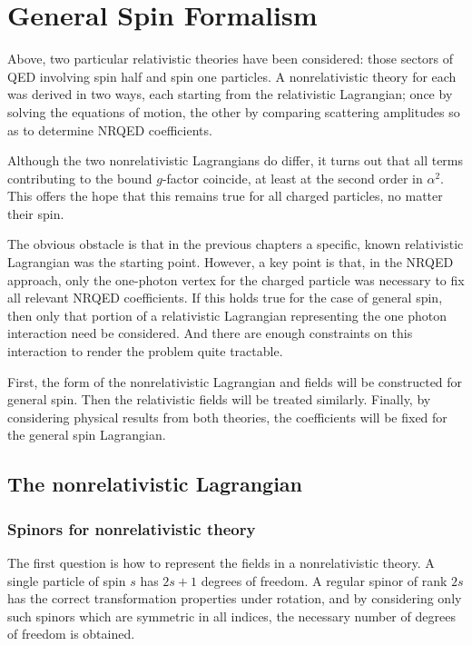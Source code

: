 
\chapter{General Spin Formalism}

Above, two particular relativistic theories have been considered: those sectors of QED involving spin half and spin one particles.  A nonrelativistic theory for each was derived in two ways, each starting from the relativistic Lagrangian; once by solving the equations of motion, the other by comparing scattering amplitudes so as to determine NRQED coefficients.

Although the two nonrelativistic Lagrangians do differ, it turns out that all terms contributing to the bound $g$-factor coincide, at least at the second order in $\alpha^2$.  This offers the hope that this remains true for all charged particles, no matter their spin.

The obvious obstacle is that in the previous chapters a specific, known relativistic Lagrangian was the starting point.  However, a key point is that, in the NRQED approach, only the one-photon vertex for the charged particle was necessary to fix all relevant NRQED coefficients.  If this holds true for the case of general spin, then only that portion of a relativistic Lagrangian representing the one photon interaction need be considered.  And there are enough constraints on this interaction to render the problem quite tractable.

First, the form of the nonrelativistic Lagrangian and fields will be constructed for general spin.  Then the relativistic fields will be treated similarly.  Finally, by considering physical results from both theories, the coefficients will be fixed for the general spin Lagrangian.



\section{The nonrelativistic Lagrangian}
\subsection{Spinors for nonrelativistic theory}
The first question is how to represent the fields in a nonrelativistic theory.  A single particle of spin $s$ has $2s+1$ degrees of freedom.  A regular spinor of rank $2s$ has the correct transformation properties under rotation, and by considering only such spinors which are symmetric in all indices, the necessary number of degrees of freedom is obtained.


